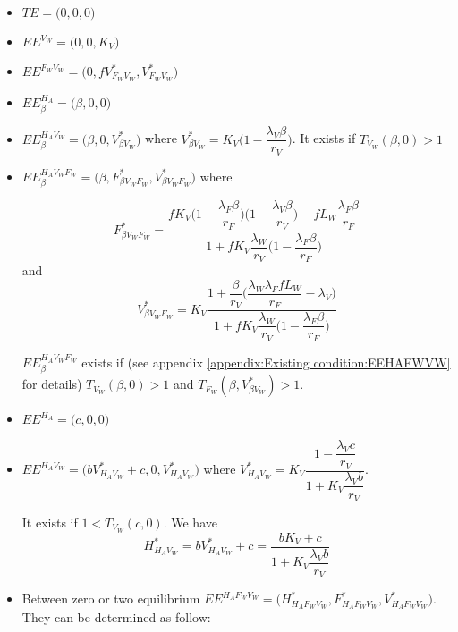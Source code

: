 \documentclass{article}
\newcommand{\lfw}{\lambda_{F}}
\newcommand{\lvw}{\lambda_{V}}
\newcommand{\lfv}{\lambda_{W}}
\begin{document}
\begin{itemize}
\item $TE = \Big(0,0,0\Big)$
\item $EE^{V_W} = \Big(0,0 ,K_V\Big)$
\item $EE^{F_WV_W} = \Big(0, fV^*_{F_WV_W},V^*_{F_WV_W}\Big)$
\item $EE^{H_A}_\beta = \Big(\beta,0,0\Big)$
\item $EE^{H_AV_W}_\beta = \Big(\beta,0,V_{\beta V_W}^* \Big)$ where $V_{\beta V_W}^* = K_V \Big(1 - \dfrac{\lvw \beta}{r_V} \Big)$. It exists if $T_{V_W}(\beta, 0) >1$
\item $EE^{H_AV_WF_W}_\beta = \Big(\beta,F_{\beta V_WF_W}^*,V_{\beta V_WF_W}^*\Big)$ where

$$F_{\beta V_WF_W}^* = \dfrac{fK_V\Big(1 - \dfrac{\lfw \beta}{r_F}\Big)\Big(1 - \dfrac{\lvw \beta}{r_V}\Big) - fL_W \dfrac{\lfw \beta}{r_F}}{1 + f K_V \dfrac{\lfv}{r_V} \Big(1 - \dfrac{\lfw \beta}{r_F}\Big)} $$
and
$$V_{\beta V_WF_W}^* = K_V \dfrac{1 + \dfrac{\beta}{r_V}\Big(\dfrac{\lfv \lfw f L_W}{r_F} - \lvw \Big)}{1 + fK_V\dfrac{\lfv}{r_V}\Big(1 - \dfrac{\lfw \beta}{r_F}\Big)}
$$

$EE^{H_AV_WF_W}_\beta$ exists if (see appendix \ref{appendix:Existing condition:EEHAFWVW} for details) $T_{V_W}(\beta, 0) > 1$ and $T_{F_W}(\beta, V^*_{\beta V_W}) > 1$.

\item $EE^{H_A} = \Big(c, 0, 0\Big)$
\item $EE^{H_AV_W} = \Big(bV^*_{H_AV_W} + c, 0, V^*_{H_AV_W} \Big)$ where $V^*_{H_AV_W} = K_V \dfrac{1-\dfrac{\lvw c}{r_V}}{1 + K_V \dfrac{\lvw b}{r_V}}$. 

It exists if $1 < T_{V_W}(c, 0)$.
We have
$$H^*_{H_AV_W} = bV^*_{H_AV_W} + c = \dfrac{bK_V + c}{1 + K_V \dfrac{\lvw b}{r_V}} $$

\item Between zero or two equilibrium $EE^{H_AF_WV_W} = \Big(H^*_{H_AF_WV_W}, F^*_{H_AF_WV_W}, V^*_{H_AF_WV_W}\Big)$. They can be determined as follow:


\end{itemize}
\end{document}
